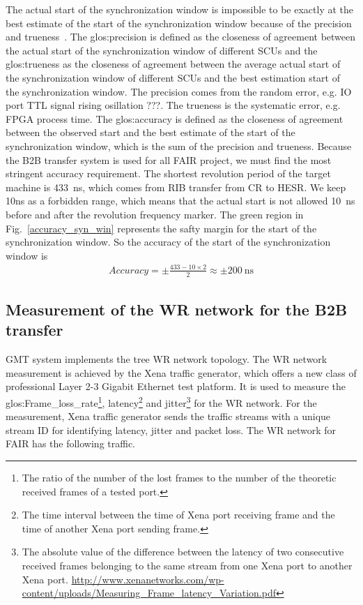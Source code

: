 The actual start of the synchronization window is impossible to be exactly at the best estimate of the start of the synchronization window because of the precision and trueness~\cite{Accuracy}. The \gls{glos:precision} is defined as the closeness of agreement between the actual start of the synchronization window of different SCUs and the \gls{glos:trueness} as the closeness of agreement between the average actual start of the synchronization window of different SCUs and the best estimation start of the synchronization window. The precision comes from the random error, e.g. IO port \gls{TTL} signal rising osillation ???. The trueness is the systematic error, e.g. FPGA process time. The \gls{glos:accuracy} is defined as the closeness of agreement between the observed start and the best estimate of the start of the synchronization window, which is the sum of the precision and trueness. Because the B2B transfer system is used for all FAIR project, we must find the most stringent accuracy requirement. The shortest revolution period of the target machine is \SI{433}{\ns}, which comes from RIB transfer from CR to HESR. We keep 10ns as a forbidden range, which means that the actual start is not allowed \SI{10}{\ns} before and after the revolution frequency marker. The green region in Fig.~\ref{accuracy_syn_win} represents the safty margin for the start of the synchronization window. So the accuracy of the start of the synchronization window is 
\begin{equation}
\begin{aligned}
Accuracy=\pm\frac{433-10 \times 2}{2}\approx \pm \SI{200}{\ns}
\end{aligned}
\end{equation}

\subsection{Measurement of the WR network for the B2B transfer}
GMT system implements the tree WR network topology. The WR network measurement is achieved by the Xena traffic generator, which offers a new class of professional Layer 2-3 Gigabit Ethernet test platform. It is used to measure the \gls{glos:Frame_loss_rate}\footnote{The ratio of the number of the lost frames to the number of the theoretic received frames of a tested port.}, \gls{latency}\footnote{The time interval between the time of Xena port receiving frame and the time of another Xena port sending frame.} and \gls{jitter}\footnote{The absolute value of the difference between the latency of two consecutive received frames belonging to the same stream from one Xena port to another Xena port. \newline\url{http://www.xenanetworks.com/wp-content/uploads/Measuring_Frame_latency_Variation.pdf}} for the WR network. For the measurement, Xena traffic generator sends the traffic streams with a unique stream ID for identifying latency, jitter and packet loss. The WR network for FAIR has the following traffic.

